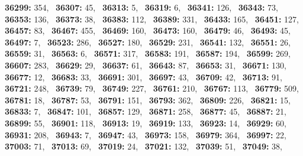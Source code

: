 \textbf{36299:} 354,\allowbreak~ 
\textbf{36307:} 45,\allowbreak~ 
\textbf{36313:} 5,\allowbreak~ 
\textbf{36319:} 6,\allowbreak~ 
\textbf{36341:} 126,\allowbreak~ 
\textbf{36343:} 73,\allowbreak~ 
\textbf{36353:} 136,\allowbreak~ 
\textbf{36373:} 38,\allowbreak~ 
\textbf{36383:} 112,\allowbreak~ 
\textbf{36389:} 331,\allowbreak~ 
\textbf{36433:} 165,\allowbreak~ 
\textbf{36451:} 127,\allowbreak~ 
\textbf{36457:} 83,\allowbreak~ 
\textbf{36467:} 455,\allowbreak~ 
\textbf{36469:} 160,\allowbreak~ 
\textbf{36473:} 160,\allowbreak~ 
\textbf{36479:} 46,\allowbreak~ 
\textbf{36493:} 45,\allowbreak~ 
\textbf{36497:} 7,\allowbreak~ 
\textbf{36523:} 286,\allowbreak~ 
\textbf{36527:} 180,\allowbreak~ 
\textbf{36529:} 231,\allowbreak~ 
\textbf{36541:} 132,\allowbreak~ 
\textbf{36551:} 26,\allowbreak~ 
\textbf{36559:} 31,\allowbreak~ 
\textbf{36563:} 6,\allowbreak~ 
\textbf{36571:} 317,\allowbreak~ 
\textbf{36583:} 191,\allowbreak~ 
\textbf{36587:} 194,\allowbreak~ 
\textbf{36599:} 269,\allowbreak~ 
\textbf{36607:} 283,\allowbreak~ 
\textbf{36629:} 29,\allowbreak~ 
\textbf{36637:} 61,\allowbreak~ 
\textbf{36643:} 87,\allowbreak~ 
\textbf{36653:} 31,\allowbreak~ 
\textbf{36671:} 130,\allowbreak~ 
\textbf{36677:} 12,\allowbreak~ 
\textbf{36683:} 33,\allowbreak~ 
\textbf{36691:} 301,\allowbreak~ 
\textbf{36697:} 43,\allowbreak~ 
\textbf{36709:} 42,\allowbreak~ 
\textbf{36713:} 91,\allowbreak~ 
\textbf{36721:} 248,\allowbreak~ 
\textbf{36739:} 79,\allowbreak~ 
\textbf{36749:} 227,\allowbreak~ 
\textbf{36761:} 210,\allowbreak~ 
\textbf{36767:} 113,\allowbreak~ 
\textbf{36779:} 509,\allowbreak~ 
\textbf{36781:} 18,\allowbreak~ 
\textbf{36787:} 53,\allowbreak~ 
\textbf{36791:} 151,\allowbreak~ 
\textbf{36793:} 362,\allowbreak~ 
\textbf{36809:} 226,\allowbreak~ 
\textbf{36821:} 15,\allowbreak~ 
\textbf{36833:} 7,\allowbreak~ 
\textbf{36847:} 101,\allowbreak~ 
\textbf{36857:} 129,\allowbreak~ 
\textbf{36871:} 258,\allowbreak~ 
\textbf{36877:} 45,\allowbreak~ 
\textbf{36887:} 21,\allowbreak~ 
\textbf{36899:} 55,\allowbreak~ 
\textbf{36901:} 118,\allowbreak~ 
\textbf{36913:} 19,\allowbreak~ 
\textbf{36919:} 133,\allowbreak~ 
\textbf{36923:} 14,\allowbreak~ 
\textbf{36929:} 60,\allowbreak~ 
\textbf{36931:} 208,\allowbreak~ 
\textbf{36943:} 7,\allowbreak~ 
\textbf{36947:} 43,\allowbreak~ 
\textbf{36973:} 158,\allowbreak~ 
\textbf{36979:} 364,\allowbreak~ 
\textbf{36997:} 22,\allowbreak~ 
\textbf{37003:} 71,\allowbreak~ 
\textbf{37013:} 69,\allowbreak~ 
\textbf{37019:} 24,\allowbreak~ 
\textbf{37021:} 132,\allowbreak~ 
\textbf{37039:} 51,\allowbreak~ 
\textbf{37049:} 38,\allowbreak~ 
